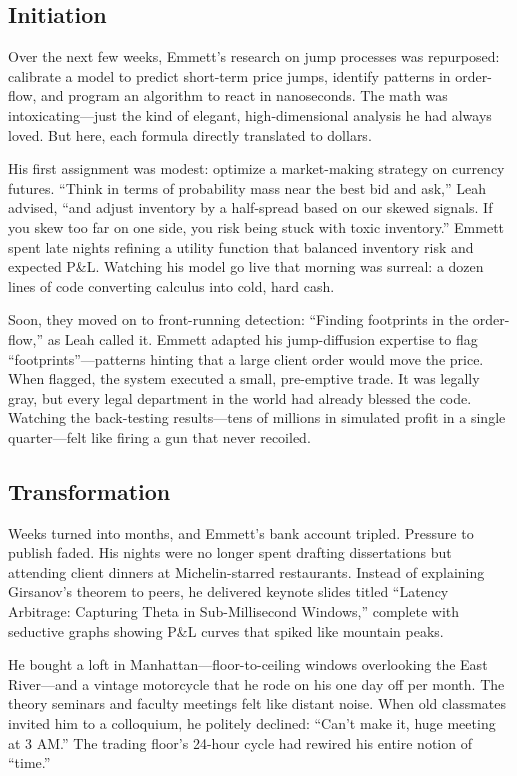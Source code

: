 \subsection{Initiation}

Over the next few weeks, Emmett’s research on jump processes was repurposed: calibrate a model to predict 
short-term price jumps, identify patterns in order-flow, and program an algorithm to react in nanoseconds. 
The math was intoxicating—just the kind of elegant, high-dimensional analysis he had always loved. But here, 
each formula directly translated to dollars.

His first assignment was modest: optimize a market-making strategy on currency futures. “Think in terms of 
probability mass near the best bid and ask,” Leah advised, “and adjust inventory by a half-spread based on 
our skewed signals. If you skew too far on one side, you risk being stuck with toxic inventory.” Emmett spent 
late nights refining a utility function that balanced inventory risk and expected P\&L. Watching his model go 
live that morning was surreal: a dozen lines of code converting calculus into cold, hard cash.

Soon, they moved on to front-running detection: “Finding footprints in the order-flow,” as Leah called it. 
Emmett adapted his jump-diffusion expertise to flag “footprints”—patterns hinting that a large client order 
would move the price. When flagged, the system executed a small, pre-emptive trade. It was legally gray, but 
every legal department in the world had already blessed the code. Watching the back-testing results—tens of 
millions in simulated profit in a single quarter—felt like firing a gun that never recoiled.

\subsection{Transformation}

Weeks turned into months, and Emmett’s bank account tripled. Pressure to publish faded. His nights were no 
longer spent drafting dissertations but attending client dinners at Michelin-starred restaurants. Instead 
of explaining Girsanov’s theorem to peers, he delivered keynote slides titled “Latency Arbitrage: Capturing 
Theta in Sub-Millisecond Windows,” complete with seductive graphs showing P\&L curves that spiked like mountain 
peaks.

He bought a loft in Manhattan—floor-to-ceiling windows overlooking the East River—and a vintage motorcycle 
that he rode on his one day off per month. The theory seminars and faculty meetings felt like distant noise. 
When old classmates invited him to a colloquium, he politely declined: “Can’t make it, huge meeting at 3 AM.” 
The trading floor’s 24-hour cycle had rewired his entire notion of “time.”

